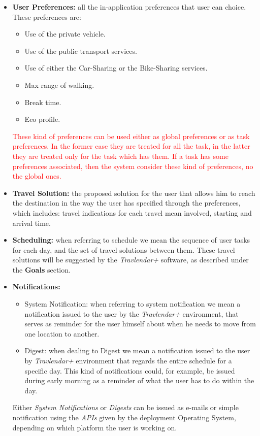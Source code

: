 \begin{itemize}
    
    \item \textbf{User Preferences:} all the in-application preferences that user can choice. These preferences are: 
    \begin{itemize}
        \item Use of the private vehicle.
        \item Use of the public transport services.
        \item Use of either the Car-Sharing or the Bike-Sharing services.
        \item Max range of walking.
    	\item Break time.
    	\item Eco profile.
    \end{itemize}
    \textcolor{red}{These kind of preferences can be used either as global preferences or as task preferences. In the former case they are treated for all the task, in the latter they are treated only for the task which has them.
    If a task has some preferences associated, then the system consider these kind of preferences, no the global ones.}
    
    \item \textbf{Travel Solution:} the proposed solution for the user that allows him to reach the destination in the way the user has specified through the preferences, which includes: travel indications for each travel mean involved, starting and arrival time.

    \item \textbf{Scheduling:} when referring to schedule we mean the sequence of user tasks for each day, and the set of travel solutions between them. These travel solutions will be suggested by the \emph{Travlendar+} software, as described under the \textbf{Goals} section. 
    
     \item \textbf{Notifications:}
     \begin{itemize}
     \item System Notification: when referring to system notification we mean a notification issued to the user by the \emph{Travlendar+} environment, that serves as reminder for the user himself about when he needs to move from one location to another. 
     \item Digest: when dealing to Digest we mean a notification issued to the user by \emph{Travlendar+} environment that regards the entire schedule for a specific day. This kind of notifications could, for example, be issued during early morning as a reminder of what the user has to do within the day.
     \end{itemize}
     Either \emph{System Notifications} or \emph{Digests} can be issued as e-mails or simple notification using the \emph{APIs} given by the deployment Operating System, depending on which platform the user is working on.   
     

\end{itemize}
